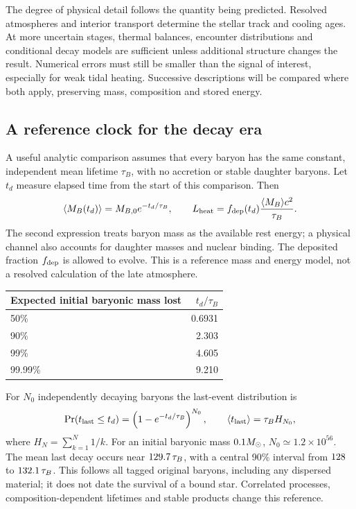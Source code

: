 The degree of physical detail follows the quantity being predicted. Resolved
atmospheres and interior transport determine the stellar track and cooling
ages. At more uncertain stages, thermal balances, encounter distributions
and conditional decay models are sufficient unless additional structure changes
the result. Numerical errors must still be smaller than the signal of interest,
especially for weak tidal heating. Successive descriptions will be compared
where both apply, preserving mass, composition and stored energy.

\clearpage
\subsection{A reference clock for the decay era}
A useful analytic comparison assumes that every baryon has the same constant,
independent mean lifetime $\tau_B$, with no accretion or stable daughter baryons.
Let $t_d$ measure elapsed time from the start of this comparison. Then
\begin{equation}
 \langle M_B(t_d)\rangle=M_{B,0}e^{-t_d/\tau_B},\qquad
 L_{\rm heat}=f_{\rm dep}(t_d)\frac{\langle M_B\rangle c^2}{\tau_B}.
\end{equation}
The second expression treats baryon mass as the available rest energy;
a physical channel also accounts for daughter masses and nuclear binding.
The deposited fraction $f_{\rm dep}$ is allowed to evolve. This is a reference
mass and energy model, not a resolved calculation of the late atmosphere.

\begin{center}\small
\begin{tabular}{@{}lr@{}}\toprule
Expected initial baryonic mass lost & $t_d/\tau_B$ \\\midrule
50\% & 0.6931 \\
90\% & 2.303 \\
99\% & 4.605 \\
99.99\% & 9.210 \\\bottomrule
\end{tabular}\end{center}

For $N_0$ independently decaying baryons the last-event distribution is
\begin{equation}
 \Pr(t_{\rm last}\leq t_d)=\left(1-e^{-t_d/\tau_B}\right)^{N_0},\qquad
 \langle t_{\rm last}\rangle=\tau_B H_{N_0},
\end{equation}
where $H_N=\sum_{k=1}^{N}1/k$. For an initial baryonic mass $0.1M_\odot$,
$N_0\simeq1.2\times10^{56}$. The mean last decay occurs near
$129.7\,\tau_B$, with a central 90\% interval from
$128$ to $132.1\,\tau_B$.
This follows all tagged original baryons, including any dispersed material;
it does not date the survival of a bound star. Correlated processes,
composition-dependent lifetimes and stable products change this reference.

